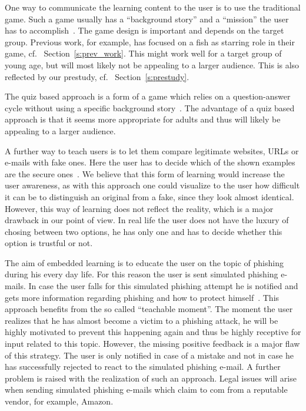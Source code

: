 \begin{description}[leftmargin=0cm]
	\item[Game Based Learning] One way to communicate the learning content to the user is to use the traditional game.
 Such a game usually has a ``background story'' and a ``mission'' the user has to accomplish~\cite{sheng2007antiphishingphil,antiphishingphyllis}. The game design is important and depends on the target group.
 Previous work, for example, has focused on a fish as starring role in their game, cf.
~Section~\ref{s:prev_work}. This might work well for a target group of young age, but will most likely not be appealing to a larger audience.
 This is also reflected by our prestudy, cf.
~Section~\ref{s:prestudy}.
	\item[Quiz Based Learning] The quiz based approach is a form of a game which relies on a question-answer cycle without using a specific background story~\cite{onguardonline}. The advantage of a quiz based approach is that it seems more appropriate for adults and thus will likely be appealing to a larger audience.

	\item[Comparison Based Learning] A further way to teach users is to let them compare legitimate websites, URLs or e-mails with fake ones.
 Here the user has to decide which of the shown examples are the secure ones~\cite{staysafeonline}. We believe that this form of learning would increase the user awareness, as with this approach one could visualize to the user how difficult it can be to distinguish an original from a fake, since they look almost identical.
 However, this way of learning does not reflect the reality, which is a major drawback in our point of view.
 In real life the user does not have the luxury of chosing between two options, he has only one and has to decide whether this option is trustful or not.

	\item[Emdedded Learning] The aim of embedded learning is to educate the user on the topic of phishing during his every day life.
 For this reason the user is sent simulated phishing e-mails.
 In case the user falls for this simulated phishing attempt he is notified and gets more information regarding phishing and how to protect himself~\cite{embedded2011jansson, kumaraguru2009phishguru}. This approach benefits from the so called ``teachable moment''. The moment the user realizes that he has almost become a victim to a phishing attack, he will be highly motivated to prevent this happening again and thus be highly receptive for input related to this topic.
 However, the missing positive feedback is a major flaw of this strategy.
 The user is only notified in case of a mistake and not in case he has successfully rejected to react to the simulated phishing e-mail.
 A further problem is raised with the realization of such an approach.
 Legal issues will arise when sending simulated phishing e-mails which claim to com from a reputable vendor, for example, Amazon.

\end{description}

